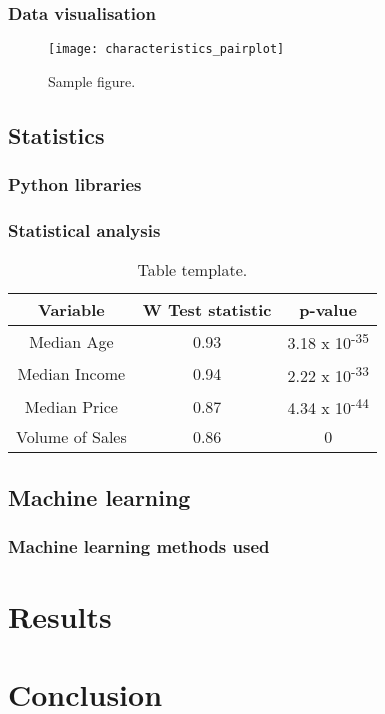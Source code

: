 \documentclass[hidelinks,12pt,oneside]{report} %
\begin{document}
\subsection{Data visualisation}

\begin{figure}[!ht]
	\centering
	\vspace{.4218cm}
		\texttt{[image: characteristics\_pairplot]}	\captionsetup{justification=justified,width=1\linewidth}
	\caption{Sample figure.}
\label{fig:characteristics_pairplot}
\end{figure}



\section{Statistics}
\subsection{Python libraries}


\subsection{Statistical analysis}

\begin{table}[h!]
\centering
\begin{tabular}{||c | c | c ||} 
 \hline
 Variable & W Test statistic & p-value \\ [0.0ex] 
 \hline\hline
 Median Age & 0.93 & 3.18 x 10\textsuperscript{-35} \\ 
 \hline
 Median Income & 0.94 & 2.22 x 10\textsuperscript{-33} \\
 \hline
 Median Price & 0.87 & 4.34 x 10\textsuperscript{-44} \\
 \hline
  Volume of Sales & 0.86 & 0 \\ [0.0ex] 
 \hline
\end{tabular}
\caption{Table template.}
\label{table:1}
\end{table}


\section{Machine learning}

\subsection{Machine learning methods used}

\chapter{Results}

\chapter{Conclusion}


\printbibliography
 
\end{document}

